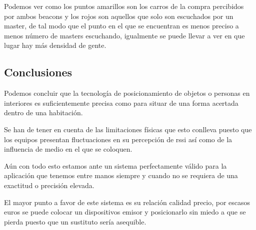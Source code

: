 \documentclass[paper=a4, fontsize=11pt,twoside]{scrartcl}
\begin{document}
            Podemos ver como los puntos amarillos son los carros de la compra percibidos por ambos beacons y los rojos son aquellos
            que solo son escuchados por un master, de tal modo que el punto en el que se encuentran es menos preciso a menos número de 
            masters escuchando, igualmente se puede llevar a ver en que lugar hay más densidad de gente.

    \subsection{Conclusiones}
        Podemos concluir que la tecnología de posicionamiento de objetos o personas en interiores es suficientemente precisa como para 
        situar de una forma acertada dentro de una habitación.
        
        Se han de tener en cuenta de las limitaciones físicas que esto conlleva puesto
        que los equipos presentan fluctuaciones en su percepción de rssi así como de la influencia de medio en el que se coloquen.

        Aún con todo esto estamos ante un sistema perfectamente válido para la aplicación que tenemos entre manos siempre y cuando no se requiera de una
        exactitud o precisión elevada. 

        El mayor punto a favor de este sistema es su relación calidad precio, por escasos euros se puede colocar un dispositivos emisor y posicionarlo 
        sin miedo a que se pierda puesto que un sustituto sería asequible.
\end{document}
